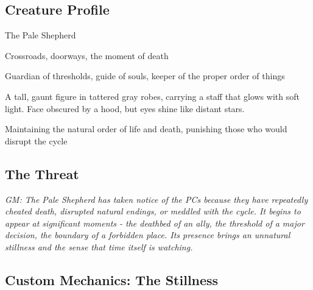 \documentclass[11pt]{article}
\newcommand{\gm}[1]{\textit{GM: #1}}
\begin{document}
\subsection*{Creature Profile}

\begin{description}[leftmargin=*]
\item[Name] The Pale Shepherd
\item[Domain] Crossroads, doorways, the moment of death
\item[Nature] Guardian of thresholds, guide of souls, keeper of the proper order of things
\item[Appearance] A tall, gaunt figure in tattered gray robes, carrying a staff that glows with soft light. Face obscured by a hood, but eyes shine like distant stars.
\item[Motivation] Maintaining the natural order of life and death, punishing those who would disrupt the cycle
\end{description}

\subsection*{The Threat}

\gm{The Pale Shepherd has taken notice of the PCs because they have repeatedly cheated death, disrupted natural endings, or meddled with the cycle. It begins to appear at significant moments - the deathbed of an ally, the threshold of a major decision, the boundary of a forbidden place. Its presence brings an unnatural stillness and the sense that time itself is watching.}

\subsection*{Custom Mechanics: The Stillness}
\end{document}
